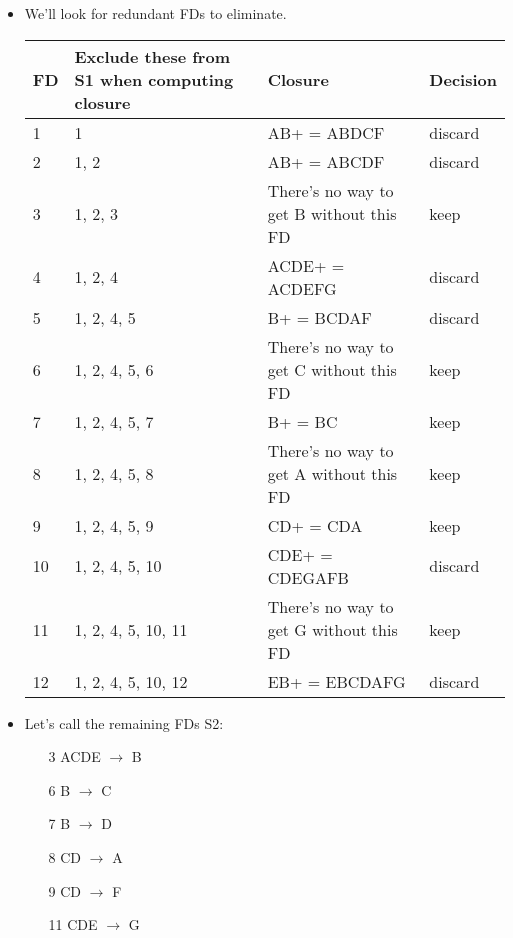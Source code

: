 \documentclass{article}
\begin{document}
\begin{enumerate}
\begin{enumerate} [leftmargin=0pt, itemindent=*]
\begin{itemize}
\item %
We'll look for redundant FDs to eliminate.
\begin{table}[h!]
\centering
\begin{tabular}{ p{0.5cm} | p{4cm} | p{8cm} | p{2cm} } 
 FD & Exclude these from S1 when computing closure & Closure & Decision \\ [0.5ex] 
 \hline
 1 & 1 & AB+ = ABDCF & discard \\ 
 \hline
 2 & 1, 2 & AB+ = ABCDF & discard \\
 \hline
 3 & 1, 2, 3 & There's no way to get B without this FD & keep \\
 \hline
 4 & 1, 2, 4 & ACDE+ = ACDEFG & discard \\
 \hline
 5 & 1, 2, 4, 5 & B+ = BCDAF & discard \\
  \hline
 6 & 1, 2, 4, 5, 6 & There's no way to get C without this FD & keep \\
  \hline
 7 & 1, 2, 4, 5, 7 & B+ = BC & keep \\
  \hline
 8 & 1, 2, 4, 5, 8 & There's no way to get A without this FD & keep \\
  \hline
 9 & 1, 2, 4, 5, 9 & CD+ = CDA & keep \\
  \hline
 10 & 1, 2, 4, 5, 10 & CDE+ = CDEGAFB & discard \\
  \hline
 11 & 1, 2, 4, 5, 10, 11 & There's no way to get G without this FD & keep \\
  \hline
 12 & 1, 2, 4, 5, 10, 12 & EB+ = EBCDAFG & discard \\
\end{tabular}
\end{table}

\item %
Let's call the remaining FDs S2:
\begin{enumerate} 
\item[3] ACDE $\rightarrow$ B
\item[6] B $\rightarrow$ C
\item[7] B $\rightarrow$ D
\item[8] CD $\rightarrow$ A
\item[9] CD $\rightarrow$ F
\item[11] CDE $\rightarrow$ G
\end{enumerate}


\end{itemize}
\end{enumerate}
\end{enumerate}
\end{document}
